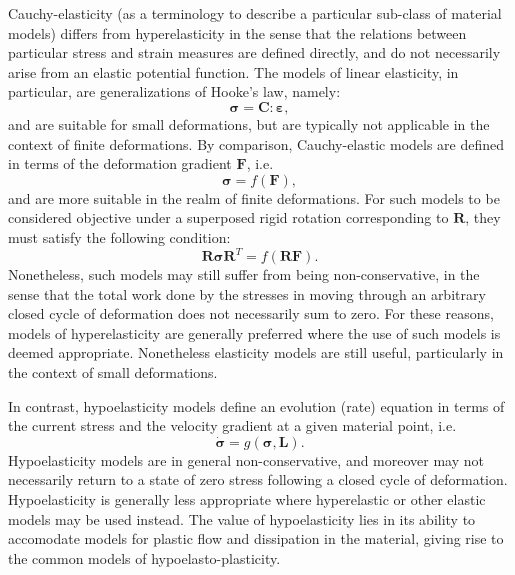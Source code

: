 Cauchy-elasticity (as a terminology to describe a particular sub-class of material models) differs from hyperelasticity in the sense that the relations between particular stress and strain measures are defined directly, and do not necessarily arise from an elastic potential function. The models of linear elasticity, in particular, are generalizations of Hooke's law, namely:
\begin{equation}
  \boldsymbol{\sigma} = \mathbf{C} \colon \boldsymbol{\varepsilon},
\end{equation}
and are suitable for small deformations, but are typically not applicable in the context of finite deformations. By comparison, Cauchy-elastic models are defined in terms of the deformation gradient $\mathbf{F}$, i.e.
\begin{equation}
  \boldsymbol{\sigma} = f (\mathbf{F}),
\end{equation}
and are more suitable in the realm of finite deformations. For such models to be considered objective under a superposed rigid rotation corresponding to $\mathbf{R}$, they must satisfy the following condition:
\begin{equation}
  \mathbf{R} \boldsymbol{\sigma} \mathbf{R}^T = f (\mathbf{R} \mathbf{F}).
\end{equation}
Nonetheless, such models may still suffer from being non-conservative, in the sense that the total work done by the stresses in moving through an arbitrary closed cycle of deformation does not necessarily sum to zero. For these reasons, models of hyperelasticity are generally preferred where the use of such models is deemed appropriate. Nonetheless elasticity models are still useful, particularly in the context of small deformations.

In contrast, hypoelasticity models define an evolution (rate) equation in terms of the current stress and the velocity gradient at a given material point, i.e.
\begin{equation}
  \dot{\boldsymbol{\sigma}} = g(\boldsymbol{\sigma}, \mathbf{L}).
\end{equation}
Hypoelasticity models are in general non-conservative, and moreover may not necessarily return to a state of zero stress following a closed cycle of deformation. Hypoelasticity is generally less appropriate where hyperelastic or other elastic models may be used instead. The value of hypoelasticity lies in its ability to accomodate models for plastic flow and dissipation in the material, giving rise to the common models of hypoelasto-plasticity.

